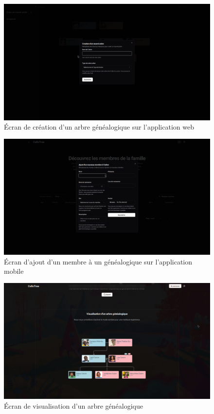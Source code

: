 %

\begin{figure}[H]
  \centering
  \includegraphics[width=1\textwidth]{capture/tree.png}
  \caption{Écran de création d'un arbre généalogique sur l'application web}
\end{figure}

\begin{figure}[H]
  \centering
  \includegraphics[width=1\textwidth]{capture/member.png}
  \caption{Écran d'ajout d'un membre à un généalogique sur l'application mobile}
\end{figure}

\begin{figure}[H]
  \centering
  \includegraphics[width=1\textwidth]{capture/view.png}
  \caption{Écran de visualisation d'un arbre généalogique}
\end{figure}


